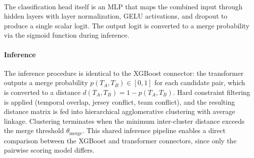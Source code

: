 \

The classification head itself is an MLP that maps the combined input through hidden layers with layer normalization, GELU activations, and dropout to produce a single scalar logit. The output logit is converted to a merge probability via the sigmoid function during inference.

\paragraph{Inference}
The inference procedure is identical to the XGBoost connector: the transformer outputs a merge probability $p(T_A, T_B) \in [0,1]$ for each candidate pair, which is converted to a distance $d(T_A, T_B) = 1 - p(T_A, T_B)$. Hard constraint filtering is applied (temporal overlap, jersey conflict, team conflict), and the resulting distance matrix is fed into hierarchical agglomerative clustering with average linkage. Clustering terminates when the minimum inter-cluster distance exceeds the merge threshold $\theta_{\text{merge}}$. This shared inference pipeline enables a direct comparison between the XGBoost and transformer connectors, since only the pairwise scoring model differs.
